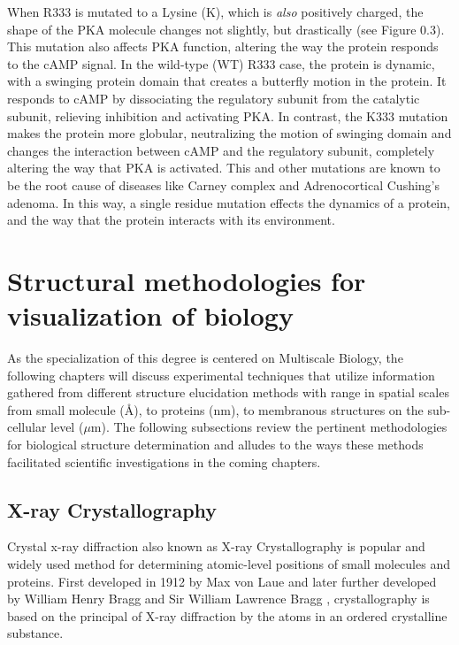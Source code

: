 \documentclass[12pt]{ucsddissertation}
\begin{document}
\begin{dissertationintroduction}
 When R333 is mutated to a Lysine (K), which is \textit{also} positively charged, the shape of the PKA molecule changes not slightly, but drastically (see Figure 0.3). This mutation also affects PKA function, altering the way the protein responds to the cAMP signal. In the wild-type (WT) R333 case, the protein is dynamic, with a swinging protein domain that creates a butterfly motion in the protein. It responds to cAMP by dissociating the regulatory subunit from the catalytic subunit, relieving inhibition and activating PKA. In contrast, the K333 mutation makes the protein more globular, neutralizing the motion of swinging domain\cite{Cheng2009} and changes the interaction between cAMP and the regulatory subunit, completely altering the way that PKA is activated. This and other mutations are known to be the root cause of diseases like Carney complex\cite{Kirschner2000} and Adrenocortical Cushing’s adenoma\cite{Calebiro2014}. In this way, a single residue mutation effects the dynamics of a protein, and the way that the protein interacts with its environment. 

\section{Structural methodologies for visualization of biology}

As the specialization of this degree is centered on Multiscale Biology, the following chapters will discuss experimental techniques that utilize information gathered from different structure elucidation methods with range in spatial scales from small molecule (\si{\angstrom}), to proteins (nm), to membranous structures on the sub-cellular level ($\mu$m). The following subsections review the pertinent methodologies for biological structure determination and alludes to the ways these methods facilitated scientific investigations in the coming chapters. 

\subsection{X-ray Crystallography}
Crystal x-ray diffraction also known as X-ray Crystallography is popular and widely used method for determining atomic-level positions of small molecules and proteins. First developed in 1912 by Max von Laue and later further developed by William Henry Bragg and Sir William Lawrence Bragg \cite{Bragg2014}, crystallography is based on the principal of X-ray diffraction by the atoms in an ordered crystalline substance. 


\end{dissertationintroduction}
\end{document}
